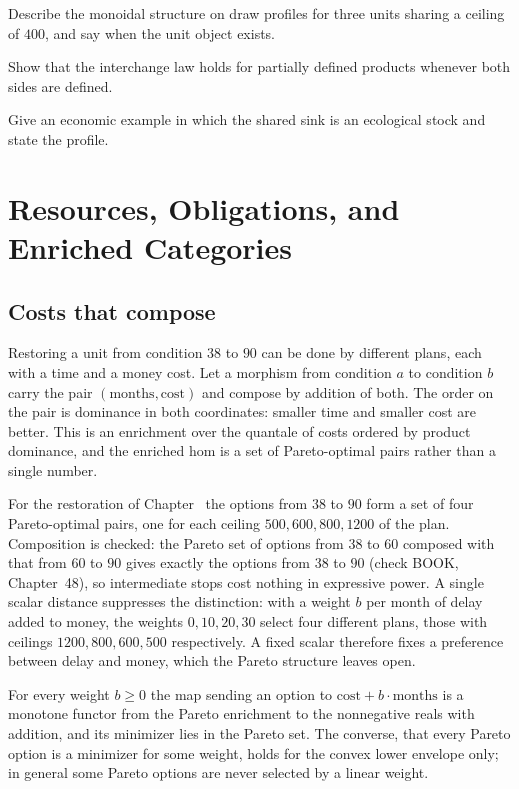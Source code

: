 \begin{exercise}Describe the monoidal structure on draw profiles for three units sharing a ceiling of $400$, and say when the unit object exists.\end{exercise}
\begin{exercise}Show that the interchange law holds for partially defined products whenever both sides are defined.\end{exercise}
\begin{exercise}Give an economic example in which the shared sink is an ecological stock and state the profile.\end{exercise}

\chapter{Resources, Obligations, and Enriched Categories}\label{ch:48}

\section{Costs that compose}

Restoring a unit from condition $38$ to $90$ can be done by different plans, each with a time and a money cost. Let a morphism from condition $a$ to condition $b$ carry the pair $(\text{months},\text{cost})$ and compose by addition of both. The order on the pair is dominance in both coordinates: smaller time and smaller cost are better. This is an enrichment over the quantale of costs ordered by product dominance, and the enriched hom is a set of Pareto-optimal pairs rather than a single number.

For the restoration of Chapter~ the options from $38$ to $90$ form a set of four Pareto-optimal pairs, one for each ceiling $500,600,800,1200$ of the plan. Composition is checked: the Pareto set of options from $38$ to $60$ composed with that from $60$ to $90$ gives exactly the options from $38$ to $90$ (check BOOK, Chapter~48), so intermediate stops cost nothing in expressive power. A single scalar distance suppresses the distinction: with a weight $b$ per month of delay added to money, the weights $0,10,20,30$ select four different plans, those with ceilings $1200,800,600,500$ respectively. A fixed scalar therefore fixes a preference between delay and money, which the Pareto structure leaves open.

\begin{proposition}\label{prop:trop}
For every weight $b\ge0$ the map sending an option to $\text{cost}+b\cdot\text{months}$ is a monotone functor from the Pareto enrichment to the nonnegative reals with addition, and its minimizer lies in the Pareto set. The converse, that every Pareto option is a minimizer for some weight, holds for the convex lower envelope only; in general some Pareto options are never selected by a linear weight.
\end{proposition}

